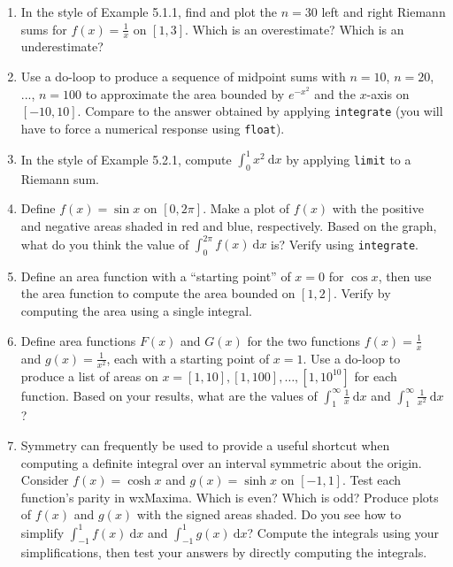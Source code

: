 \documentclass[10.5pt,twoside]{report}
\theoremstyle{definition}
\begin{document}
\begin{enumerate}

\item  In the style of Example 5.1.1, find and plot the $n=30$ left and right Riemann sums for $f(x)=\frac{1}{x}$ on $[1,3]$.  Which is an overestimate?  Which is an underestimate?

\item  Use a do-loop to produce a sequence of midpoint sums with $n=10$, $n=20$, ..., $n=100$ to approximate the area bounded by $e^{-x^2}$ and the $x$-axis on $[-10,10]$.  Compare to the answer obtained by applying \verb|integrate| (you will have to force a numerical response using \verb|float|). 

\item  In the style of Example 5.2.1, compute $\displaystyle \int_{0}^{1} x^2 \ \mathrm{d}x$ by applying \verb|limit| to a Riemann sum.

\item  Define $f(x)=\sin{x}$ on $[0,2 \pi]$.  Make a plot of $f(x)$ with the positive and negative areas shaded in red and blue, respectively.  Based on the graph, what do you think the value of $\displaystyle \int_{0}^{2 \pi} f(x) \ \mathrm{d} x$ is?  Verify using \verb|integrate|.

\item  Define an area function with a ``starting point'' of $x=0$ for $\cos{x}$, then use the area function to compute the area bounded on $[1,2]$.  Verify by computing the area using a single integral.

\item  Define area functions $F(x)$ and $G(x)$ for the two functions $f(x)=\frac{1}{x}$ and $g(x)=\frac{1}{x^2}$, each with a starting point of $x=1$.  Use a do-loop to produce a list of areas on $x=[1,10],[1,100],\dots,[1,10^{10}]$ for each function. Based on your results, what are the values of $\displaystyle \int_{1}^{\infty} \frac{1}{x} \ \mathrm{d} x$ and $\displaystyle \int_{1}^{\infty} \frac{1}{x^2} \ \mathrm{d} x$?  

\item  Symmetry can frequently be used to provide a useful shortcut when computing a definite integral over an interval symmetric about the origin.  Consider $f(x)=\cosh{x}$ and $g(x)=\sinh{x}$ on $[-1,1]$.  Test each function's parity in wxMaxima.  Which is even?  Which is odd?  Produce plots of $f(x)$ and $g(x)$ with the signed areas shaded.  Do you see how to simplify $\displaystyle \int_{-1}^{1} f(x) \ \mathrm{d}x$ and $\displaystyle \int_{-1}^{1} g(x) \ \mathrm{d}x$?  Compute the integrals using your simplifications, then test your answers by directly computing the integrals.


\end{enumerate}
\end{document}

